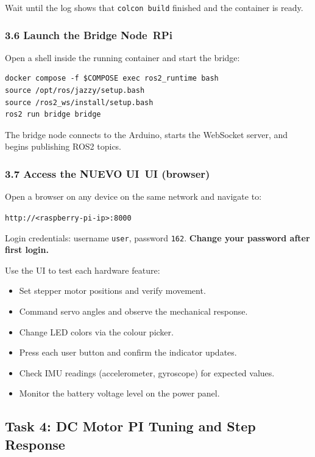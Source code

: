 \documentclass{ol-softwaremanual}
\newcommand{\onrpi}{%
  \,\colorbox{blue!20}{\footnotesize\sffamily\bfseries RPi}}
\newcommand{\onui}{%
  \,\colorbox{yellow!50}{\footnotesize\sffamily\bfseries UI (browser)}}
\begin{document}
Wait until the log shows that \texttt{colcon build} finished and the container is ready.

\subsubsection*{3.6 Launch the Bridge Node\onrpi}

Open a shell inside the running container and start the bridge:

\begin{verbatim}
docker compose -f $COMPOSE exec ros2_runtime bash
source /opt/ros/jazzy/setup.bash
source /ros2_ws/install/setup.bash
ros2 run bridge bridge
\end{verbatim}

The bridge node connects to the Arduino, starts the WebSocket server, and begins
publishing ROS2 topics.

\subsubsection*{3.7 Access the NUEVO UI\onui}

Open a browser on any device on the same network and navigate to:
\begin{center}
  \texttt{http://<raspberry-pi-ip>:8000}
\end{center}

Login credentials: username \texttt{user}, password \texttt{162}.
\textbf{Change your password after first login.}

Use the UI to test each hardware feature:
\begin{itemize}
  \item Set stepper motor positions and verify movement.
  \item Command servo angles and observe the mechanical response.
  \item Change LED colors via the colour picker.
  \item Press each user button and confirm the indicator updates.
  \item Check IMU readings (accelerometer, gyroscope) for expected values.
  \item Monitor the battery voltage level on the power panel.
\end{itemize}


\subsection{Task 4: DC Motor PI Tuning and Step Response}
\end{document}
